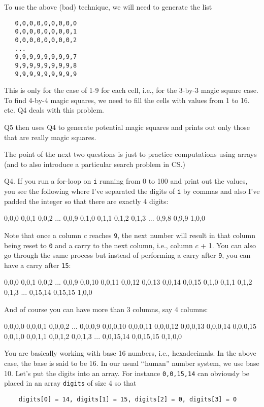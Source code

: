 To use the above (bad) technique, we will need to 
generate the list
\begin{verbatim}
   0,0,0,0,0,0,0,0,0
   0,0,0,0,0,0,0,0,1
   0,0,0,0,0,0,0,0,2
   ...
   9,9,9,9,9,9,9,9,7
   9,9,9,9,9,9,9,9,8
   9,9,9,9,9,9,9,9,9
\end{verbatim}
This is only for the case of 1-9 for each cell, i.e., for the
3-by-3 magic square case.
To find 4-by-4 magic squares, we need to fill the 
cells with values from 1 to 16.
etc.
Q4 deals with this problem.

Q5 then uses Q4 to generate potential magic squares and 
prints out only those that are really magic squares.

The point of the next two questions is just to practice 
computations using arrays (and to also introduce 
a particular search problem in CS.)


\newpage
Q4. 
If you run a for-loop on \verb!i! running from 0 to 100 and print out the
values, you see the following where I've separated the digits of \verb$i$
by commas and also I've padded the integer so that there are exactly
4 digits:
\begin{console}
0,0,0
0,0,1
0,0,2
...
0,0,9
0,1,0
0,1,1
0,1,2
0,1,3
...
0,9,8
0,9,9
1,0,0
\end{console}
Note that once a column $c$ reaches \verb!9!, the next number
will result in that column being reset to \verb!0! and a carry
to the next column, i.e., column $c$ + 1.
You can also go through the same process but instead of performing a carry
after \verb!9!, you can have a carry after \verb!15!:
\begin{console}
0,0,0
0,0,1
0,0,2
...
0,0,9
0,0,10
0,0,11
0,0,12
0,0,13
0,0,14
0,0,15
0,1,0
0,1,1
0,1,2
0,1,3
...
0,15,14
0,15,15
1,0,0
\end{console}
And of course you can have more than 3 columns, say 4 columns:
\begin{console}
0,0,0,0
0,0,0,1
0,0,0,2
...
0,0,0,9
0,0,0,10
0,0,0,11
0,0,0,12
0,0,0,13
0,0,0,14
0,0,0,15
0,0,1,0
0,0,1,1
0,0,1,2
0,0,1,3
...
0,0,15,14
0,0,15,15
0,1,0,0
\end{console}
You are basically working with base 16 numbers, i.e., hexadecimals.
In the above case, the base is said to be 16.
In our usual \lq\lq human'' number system, we use base 10.
Let's put the digits into an array.
For instance \verb!0,0,15,14! can obviously be placed in an array
\verb!digits! of size 4 so that
\begin{verbatim}
    digits[0] = 14, digits[1] = 15, digits[2] = 0, digits[3] = 0
\end{verbatim}

